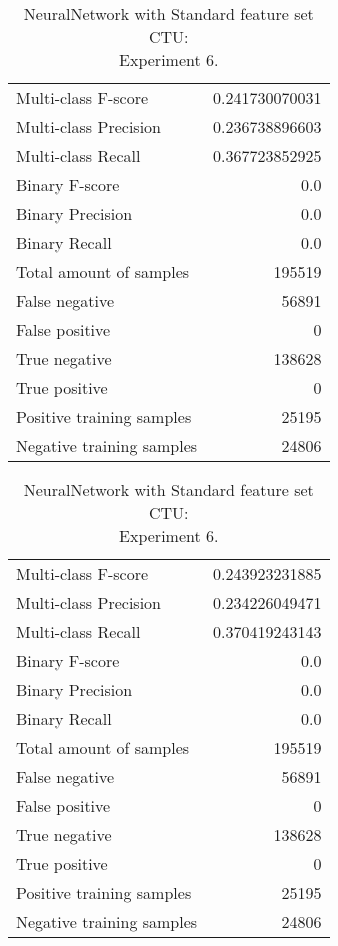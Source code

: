 \begin{table}[H]
\begin{minipage}{0.5\textwidth}
\caption{NeuralNetwork with Standard feature set CTU: \\Experiment 5.}
\centering
\begin{tabular}{l r}
\toprule
Multi-class F-score & 0.241730070031 \\
Multi-class Precision & 0.236738896603 \\
Multi-class Recall & 0.367723852925 \\
\midrule
Binary F-score & 0.0 \\
Binary Precision & 0.0 \\
Binary Recall & 0.0 \\
\midrule
Total amount of samples & 195519 \\
False negative & 56891 \\
False positive & 0 \\
True negative & 138628 \\
True positive & 0 \\
\midrule
Positive training samples & 25195 \\
Negative training samples & 24806 \\
\bottomrule
\end{tabular}
\end{minipage}
\hfillx
\begin{minipage}{0.5\textwidth}
\caption{NeuralNetwork with Standard feature set CTU: \\Experiment 6.}
\centering
\begin{tabular}{l r}
\toprule
Multi-class F-score & 0.243923231885 \\
Multi-class Precision & 0.234226049471 \\
Multi-class Recall & 0.370419243143 \\
\midrule
Binary F-score & 0.0 \\
Binary Precision & 0.0 \\
Binary Recall & 0.0 \\
\midrule
Total amount of samples & 195519 \\
False negative & 56891 \\
False positive & 0 \\
True negative & 138628 \\
True positive & 0 \\
\midrule
Positive training samples & 25195 \\
Negative training samples & 24806 \\
\bottomrule
\end{tabular}
\end{minipage}
\end{table}
